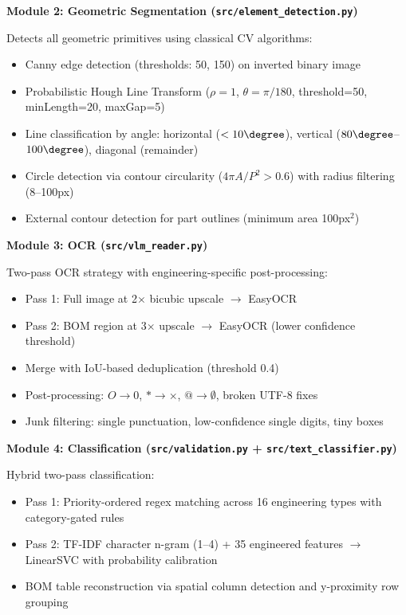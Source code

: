 \documentclass[12pt,a4paper]{article}
\begin{document}
\textbf{Module 2: Geometric Segmentation (\texttt{src/element\_detection.py})}

Detects all geometric primitives using classical CV algorithms:
\begin{itemize}[noitemsep]
    \item Canny edge detection (thresholds: 50, 150) on inverted binary image
    \item Probabilistic Hough Line Transform ($\rho=1$, $\theta=\pi/180$, threshold=50, minLength=20, maxGap=5)
    \item Line classification by angle: horizontal ($<10\degree$), vertical ($80\degree$--$100\degree$), diagonal (remainder)
    \item Circle detection via contour circularity ($4\pi A/P^2 > 0.6$) with radius filtering (8--100px)
    \item External contour detection for part outlines (minimum area 100px$^2$)
\end{itemize}

\textbf{Module 3: OCR (\texttt{src/vlm\_reader.py})}

Two-pass OCR strategy with engineering-specific post-processing:
\begin{itemize}[noitemsep]
    \item Pass 1: Full image at 2$\times$ bicubic upscale $\rightarrow$ EasyOCR
    \item Pass 2: BOM region at 3$\times$ upscale $\rightarrow$ EasyOCR (lower confidence threshold)
    \item Merge with IoU-based deduplication (threshold 0.4)
    \item Post-processing: $O \rightarrow 0$, $* \rightarrow \times$, $@ \rightarrow \emptyset$, broken UTF-8 fixes
    \item Junk filtering: single punctuation, low-confidence single digits, tiny boxes
\end{itemize}

\textbf{Module 4: Classification (\texttt{src/validation.py} + \texttt{src/text\_classifier.py})}

Hybrid two-pass classification:
\begin{itemize}[noitemsep]
    \item Pass 1: Priority-ordered regex matching across 16 engineering types with category-gated rules
    \item Pass 2: TF-IDF character n-gram (1--4) + 35 engineered features $\rightarrow$ LinearSVC with probability calibration
    \item BOM table reconstruction via spatial column detection and y-proximity row grouping
\end{itemize}
\end{document}
